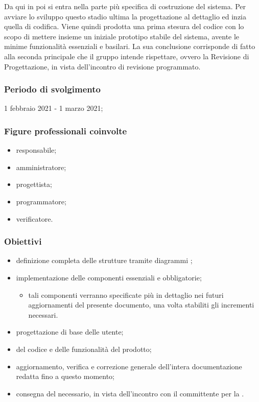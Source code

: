 Da qui in poi si entra nella parte più specifica di costruzione del sistema. Per avviare lo sviluppo questo stadio ultima la progettazione al dettaglio ed inzia quella di codifica. Viene quindi prodotta una prima stesura del codice con lo scopo di mettere insieme un iniziale prototipo stabile del sistema, avente le minime funzionalità essenziali e basilari. La sua conclusione corrisponde di fatto alla seconda  principale che il gruppo \Gruppo{} intende rispettare, ovvero la Revisione di Progettazione, in vista dell'incontro di revisione programmato.
        
        \subsubsection{Periodo di svolgimento}
        1 febbraio 2021 - 1 marzo 2021;
        
        \subsubsection{Figure professionali coinvolte}
            \begin{itemize}
                \item responsabile;
                \item amministratore;
                \item progettista;
                \item programmatore;
                \item verificatore.
            \end{itemize}

        \subsubsection{Obiettivi}    
        \begin{itemize}
            \item definizione completa delle strutture tramite diagrammi ;
            \item implementazione delle componenti essenziali e obbligatorie;
            \begin{itemize}
                \item tali componenti verranno specificate più in dettaglio nei futuri aggiornamenti del presente documento, una volta stabiliti gli incrementi necessari.
            \end{itemize}
            \item progettazione di base delle  utente;
            \item {} del codice e delle funzionalità del prodotto;
            \item aggiornamento, verifica e correzione generale dell'intera documentazione redatta fino a questo momento;
            \item consegna del  necessario, in vista dell'incontro con il committente per la \RP{}.
        \end{itemize}